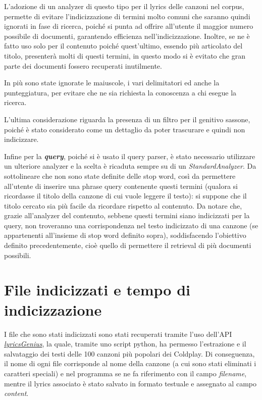 \documentclass{article}
\begin{document}
L'adozione di un analyzer di questo tipo per il lyrics delle canzoni nel corpus, permette di evitare l'indicizzazione di termini molto comuni che saranno quindi ignorati in fase di ricerca, poiché si punta ad offrire all'utente il maggior numero possibile di documenti, garantendo efficienza nell'indicizzazione. Inoltre, se ne è fatto uso solo per il contenuto poiché quest'ultimo, essendo più articolato del titolo, presenterà molti di questi termini, in questo modo si è evitato che gran parte dei documenti fossero recuperati inutilmente.

In più sono state ignorate le maiuscole, i vari delimitatori ed anche la punteggiatura, per evitare che ne sia richiesta la conoscenza a chi esegue la ricerca. 

L'ultima considerazione riguarda la presenza di un filtro per il genitivo sassone, poiché è stato considerato come un dettaglio da poter trascurare e quindi non indicizzare.

Infine per la \textbf{\textit{query}}, poiché si è usato il query parser, è stato necessario utilizzare un ulteriore analyzer e la scelta è ricaduta sempre su di un \textit{StandardAnalyzer}.
Da sottolineare che non sono state definite delle stop word, così da permettere all'utente di inserire una phrase query contenente questi termini (qualora si ricordasse il titolo della canzone di cui vuole leggere il testo): si suppone che il titolo cercato sia più facile da ricordare rispetto al contenuto. Da notare che, grazie all'analyzer del contenuto, sebbene questi termini siano indicizzati per la query, non troveranno una corrispondenza nel testo indicizzato di una canzone (se appartenenti all'insieme di stop word definito sopra), soddisfacendo l'obiettivo definito precedentemente, cioè quello di permettere il retrieval di più documenti possibili.

\section{File indicizzati e tempo di indicizzazione}
I file che sono stati indicizzati sono stati recuperati tramite l'uso dell'API \href{https://lyricsgenius.readthedocs.io/en/master/}{\textit{lyricsGenius}}, la quale, tramite uno script python, ha permesso l'estrazione e il salvataggio dei testi delle 100 canzoni più popolari dei Coldplay. Di conseguenza, il nome di ogni file corrisponde al nome della canzone (a cui sono stati eliminati i caratteri speciali) e nel programma se ne fa riferimento con il campo \textit{filename}, mentre il lyrics associato è stato salvato in formato testuale e assegnato al campo \textit{content}.
\end{document}
